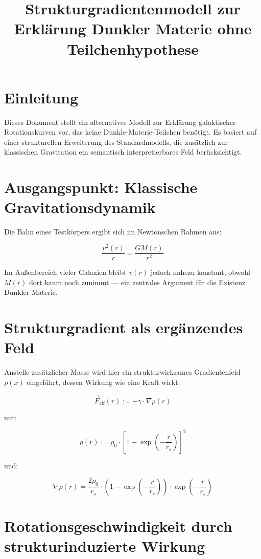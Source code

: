 \documentclass[11pt]{article}
\title{Strukturgradientenmodell zur Erklärung Dunkler Materie ohne Teilchenhypothese}
\author{}
\date{}
\begin{document}
\maketitle

\section*{Einleitung}

Dieses Dokument stellt ein alternatives Modell zur Erklärung galaktischer Rotationskurven vor, das keine Dunkle-Materie-Teilchen benötigt. Es basiert auf einer strukturellen Erweiterung des Standardmodells, die zusätzlich zur klassischen Gravitation ein semantisch interpretierbares Feld berücksichtigt.

\section*{Ausgangspunkt: Klassische Gravitationsdynamik}

Die Bahn eines Testkörpers ergibt sich im Newtonschen Rahmen aus:

\[
\frac{v^2(r)}{r} = \frac{G M(r)}{r^2}
\]

Im Außenbereich vieler Galaxien bleibt $v(r)$ jedoch nahezu konstant, obwohl $M(r)$ dort kaum noch zunimmt — ein zentrales Argument für die Existenz Dunkler Materie.

\section*{Strukturgradient als ergänzendes Feld}

Anstelle zusätzlicher Masse wird hier ein strukturwirksames Gradientenfeld $\rho(x)$ eingeführt, dessen Wirkung wie eine Kraft wirkt:

\[
\vec{F}_{\text{eff}}(r) := -\gamma \cdot \nabla \rho(r)
\]

mit:

\[
\rho(r) := \rho_0 \cdot \left[ 1 - \exp\left(-\frac{r}{r_s} \right) \right]^2
\]

und:

\[
\nabla \rho(r) = \frac{2\rho_0}{r_s} \cdot \left(1 - \exp\left(-\frac{r}{r_s} \right) \right) \cdot \exp\left(-\frac{r}{r_s} \right)
\]

\section*{Rotationsgeschwindigkeit durch strukturinduzierte Wirkung}
\end{document}
